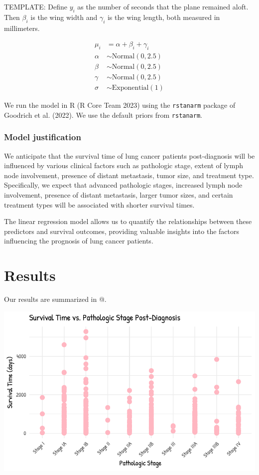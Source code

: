 \documentclass[
  letterpaper,
  DIV=11,
  numbers=noendperiod]{scrartcl}
\begin{document}
TEMPLATE: Define \(y_i\) as the number of seconds that the plane
remained aloft. Then \(\beta_i\) is the wing width and \(\gamma_i\) is
the wing length, both measured in millimeters.

\begin{align} 

\mu_i &= \alpha + \beta_i + \gamma_i\\
\alpha &\sim \mbox{Normal}(0, 2.5) \\
\beta &\sim \mbox{Normal}(0, 2.5) \\
\gamma &\sim \mbox{Normal}(0, 2.5) \\
\sigma &\sim \mbox{Exponential}(1)
\end{align}

We run the model in R (R Core Team 2023) using the \texttt{rstanarm}
package of Goodrich et al. (2022). We use the default priors from
\texttt{rstanarm}.

\hypertarget{model-justification}{%
\subsubsection{Model justification}\label{model-justification}}

We anticipate that the survival time of lung cancer patients
post-diagnosis will be influenced by various clinical factors such as
pathologic stage, extent of lymph node involvement, presence of distant
metastasis, tumor size, and treatment type. Specifically, we expect that
advanced pathologic stages, increased lymph node involvement, presence
of distant metastasis, larger tumor sizes, and certain treatment types
will be associated with shorter survival times.

The linear regression model allows us to quantify the relationships
between these predictors and survival outcomes, providing valuable
insights into the factors influencing the prognosis of lung cancer
patients.

\hypertarget{sec-results}{%
\section{Results}\label{sec-results}}

Our results are summarized in @.

\includegraphics{paper_files/figure-pdf/unnamed-chunk-4-1.pdf}
\end{document}
